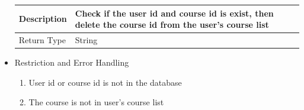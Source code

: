 \documentclass[16pt]{scrreprt}
\begin{document}
\begin{itemize}
\begin{center}
\begin{tabular}{p{5cm}p{10cm}}
        \hline
        Description & Check if the user id and course id is exist, then delete the course id from the user's course list\\
        \hline
        Return Type & String\\
        \hline
    \end{tabular}
\end{center}
\item Restriction and Error Handling\\
\begin{enumerate}
    \item User id or course id is not in the database
    \item The course is not in user's course list
\end{enumerate} 
\end{itemize}
\end{document}
